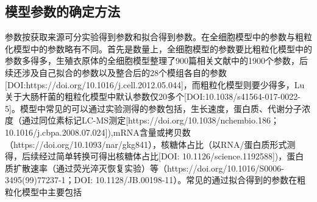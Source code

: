 \documentclass[b5paper,11pt,onecolumn,twoside,UTF8]{article}
\begin{document}
\subsection{模型参数的确定方法}
\indent 参数按获取来源可分实验得到参数和拟合得到参数。在全细胞模型中的参数与粗粒化模型中的参数略有不同。首先是数量上，全细胞模型的参数要比粗粒化模型中的参数多得多，生殖衣原体的全细胞模型整理了900篇相关文献中的1900个参数，后续还涉及自己拟合的参数以及整合后的28个模组各自的参数[DOI:https://doi.org/10.1016/j.cell.2012.05.044]，而粗粒化模型则要少得多，Lu关于大肠杆菌的粗粒化模型中默认参数仅20多个[DOI:10.1038/s41564-017-0022-5]。模型中常见的可以通过实验测得的参数包括，生长速度，蛋白质、代谢分子浓度（通过同位素标记LC-MS测定[https://doi.org/10.1038/nchembio.186；10.1016/j.cbpa.2008.07.024]),mRNA含量或拷贝数（https://doi.org/10.1093/nar/gkg841），核糖体占比（以RNA/蛋白质形式测得，后续经过简单转换可得出核糖体占比[DOI: 10.1126/science.1192588])，蛋白质扩散速率（通过荧光淬灭恢复实验）等（https://doi.org/10.1016/S0006-3495(99)77237-1；DOI: 10.1128/JB.00198-11）。常见的通过拟合得到的参数在粗粒化模型中主要包括
\end{document}
